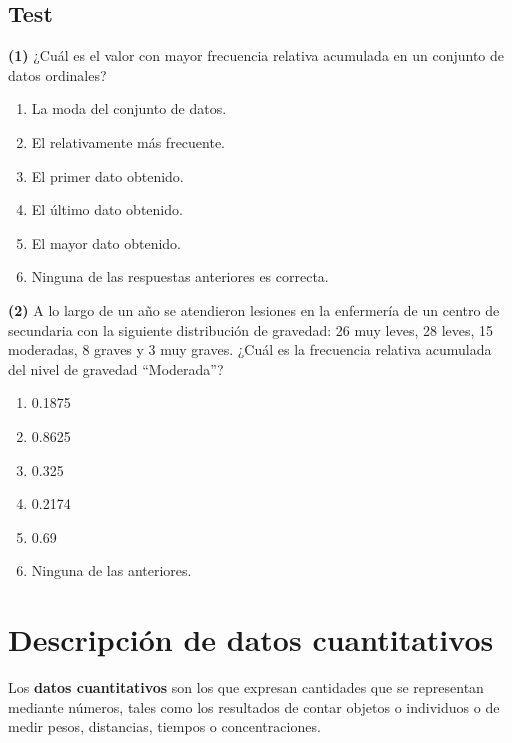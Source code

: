 \documentclass[
]{book}
\providecommand{\tightlist}{%
  \setlength{\itemsep}{0pt}\setlength{\parskip}{0pt}}
\theoremstyle{definition}
\theoremstyle{definition}
\theoremstyle{definition}
\theoremstyle{definition}
\theoremstyle{remark}
\begin{document}
\hypertarget{test-6}{%
\section{Test}\label{test-6}}

\textbf{(1)} ¿Cuál es el valor con mayor frecuencia relativa acumulada en un conjunto de datos ordinales?

\begin{enumerate}
\def\labelenumi{\arabic{enumi}.}
\tightlist
\item
  La moda del conjunto de datos.
\item
  El relativamente más frecuente.
\item
  El primer dato obtenido.\\
\item
  El último dato obtenido.\\
\item
  El mayor dato obtenido.
\item
  Ninguna de las respuestas anteriores es correcta.
\end{enumerate}

\textbf{(2)} A lo largo de un año se atendieron lesiones en la enfermería de un centro de secundaria con la siguiente distribución de gravedad: 26 muy leves, 28 leves, 15 moderadas, 8 graves y 3 muy graves. ¿Cuál es la frecuencia relativa acumulada del nivel de gravedad ``Moderada''?

\begin{enumerate}
\def\labelenumi{\arabic{enumi}.}
\tightlist
\item
  0.1875
\item
  0.8625
\item
  0.325
\item
  0.2174
\item
  0.69
\item
  Ninguna de las anteriores.
\end{enumerate}

\hypertarget{descripciuxf3n-de-datos-cuantitativos}{%
\chapter{Descripción de datos cuantitativos}\label{descripciuxf3n-de-datos-cuantitativos}}

Los \textbf{datos cuantitativos} son los que expresan cantidades que se representan mediante números, tales como los resultados de contar objetos o individuos o de medir pesos, distancias, tiempos o concentraciones.
\end{document}

